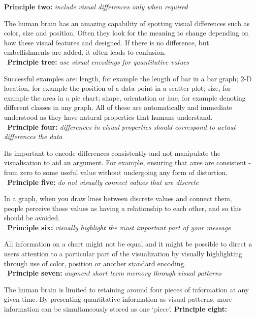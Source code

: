 \documentclass[a4paper,11pt,titlepage]{article}
\begin{document}
		\textbf{Principle two:} \textit{include visual differences only when required} 
		\par
		The human brain has an amazing capability of spotting visual differences such as color, size and position. Often they look for the meaning to change depending on how these visual features and designed. If there is no difference, but embellishments are added, it often leads to confusion.
		\\\ 
		\textbf{Principle tree:} \textit{use visual encodings for quantitative values}
		\par 
		Successful examples are: length, for example the length of bar in a bar graph; 2-D location, for example the position of a data point in a scatter plot; size, for example the area in a pie chart; shape, orientation or hue, for example denoting different classes in any graph. All of these are automatically and immediate understood as they have natural properties that humans understand. 
		\\\
		\textbf{Principle four:} \textit{differences in visual properties should correspond to actual differences the data}
		\par 
		Its important to encode differences consistently and not manipulate the visualisation to aid an argument. For example, ensuring that axes are consistent - from zero to some useful value without undergoing any form of distortion.
		\\\
		\textbf{Principle five:} \textit{do not visually connect values that are discrete}
		\par 
		In a graph, when you draw lines between discrete values and connect them, people perceive those values as having a relationship to each other, and so this should be avoided.
		\\\
		\textbf{Principle six:} \textit{visually highlight the most important part of your message}
		\par 
		All information on a chart might not be equal and it might be possible to direct a users attention to a particular part of the visualization by visually highlighting through use of color, position or another standard encoding.
		\\\
		\textbf{Principle seven:} \textit{augment short term memory through visual patterns}
		\par 
		The human brain is limited to retaining around four pieces of information at any given time. By presenting quantitative information as visual patterns, more information can be simultaneously stored as one `piece'.
		\textbf{Principle eight:}
\end{document}
